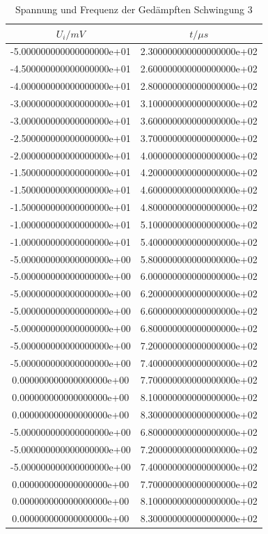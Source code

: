 \begin{table}
\caption{Spannung und Frequenz der Gedämpften Schwingung 3}
\label{tab:5a3tab}
\begin{tabular}{S S}
\toprule
{$U_i/mV$} & {$t/\mu s$ }\\
\midrule
-5.000000000000000000e+01 & 2.300000000000000000e+02\\
-4.500000000000000000e+01 & 2.600000000000000000e+02\\
-4.000000000000000000e+01 & 2.800000000000000000e+02\\
-3.000000000000000000e+01 & 3.100000000000000000e+02\\
-3.000000000000000000e+01 & 3.600000000000000000e+02\\
-2.500000000000000000e+01 & 3.700000000000000000e+02\\
-2.000000000000000000e+01 & 4.000000000000000000e+02\\
-1.500000000000000000e+01 & 4.200000000000000000e+02\\
-1.500000000000000000e+01 & 4.600000000000000000e+02\\
-1.500000000000000000e+01 & 4.800000000000000000e+02\\
-1.000000000000000000e+01 & 5.100000000000000000e+02\\
-1.000000000000000000e+01 & 5.400000000000000000e+02\\
-5.000000000000000000e+00 & 5.800000000000000000e+02\\
-5.000000000000000000e+00 & 6.000000000000000000e+02\\
-5.000000000000000000e+00 & 6.200000000000000000e+02\\
-5.000000000000000000e+00 & 6.600000000000000000e+02\\
-5.000000000000000000e+00 & 6.800000000000000000e+02\\
-5.000000000000000000e+00 & 7.200000000000000000e+02\\
-5.000000000000000000e+00 & 7.400000000000000000e+02\\
0.000000000000000000e+00 & 7.700000000000000000e+02\\
0.000000000000000000e+00 & 8.100000000000000000e+02\\
0.000000000000000000e+00 & 8.300000000000000000e+02\\
-5.000000000000000000e+00 & 6.800000000000000000e+02\\
  -5.000000000000000000e+00 & 7.200000000000000000e+02\\
  -5.000000000000000000e+00 & 7.400000000000000000e+02\\
  0.000000000000000000e+00 & 7.700000000000000000e+02\\
  0.000000000000000000e+00 & 8.100000000000000000e+02\\
  0.000000000000000000e+00 & 8.300000000000000000e+02\\
  \bottomrule
\end{tabular}
\end{table}
